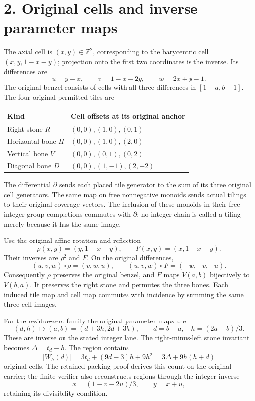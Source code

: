 \documentclass[
  11pt,
]{article}
\begin{document}

\section{2. Original cells and inverse parameter
maps}\label{original-cells-and-inverse-parameter-maps}

The axial cell is \((x,y)\in\mathbb Z^2\), corresponding to the
barycentric cell \((x,y,1-x-y)\); projection onto the first two
coordinates is the inverse. Its differences are \[
 u=y-x,\qquad v=1-x-2y,\qquad w=2x+y-1.
\] The original benzel consists of cells with all three differences in
\([1-a,b-1]\). The four original permitted tiles are

\begin{longtable}[]{@{}ll@{}}
\toprule\noalign{}
Kind & Cell offsets at its original anchor \\
\midrule\noalign{}
\endhead
\bottomrule\noalign{}
\endlastfoot
Right stone \(R\) & \((0,0),(1,0),(0,1)\) \\
Horizontal bone \(H\) & \((0,0),(1,0),(2,0)\) \\
Vertical bone \(V\) & \((0,0),(0,1),(0,2)\) \\
Diagonal bone \(D\) & \((0,0),(1,-1),(2,-2)\) \\
\end{longtable}

The differential \(\partial\) sends each placed tile generator to the
sum of its three original cell generators. The same map on free
nonnegative monoids sends actual tilings to their original coverage
vectors. The inclusion of these monoids in their free integer group
completions commutes with \(\partial\); no integer chain is called a
tiling merely because it has the same image.

Use the original affine rotation and reflection \[
 \rho(x,y)=(y,1-x-y),\qquad F(x,y)=(x,1-x-y).
\] Their inverses are \(\rho^2\) and \(F\). On the original differences,
\[
 (u,v,w)\circ\rho=(v,w,u),\qquad
 (u,v,w)\circ F=(-w,-v,-u).
\] Consequently \(\rho\) preserves the original benzel, and \(F\) maps
\(V(a,b)\) bijectively to \(V(b,a)\). It preserves the right stone and
permutes the three bones. Each induced tile map and cell map commutes
with incidence by summing the same three cell images.

For the residue-zero family the original parameter maps are \[
 (d,h)\longmapsto(a,b)=(d+3h,2d+3h),\qquad
 d=b-a,\quad h=(2a-b)/3.
\] These are inverse on the stated integer lane. The right-minus-left
stone invariant becomes \(\Delta=t_d-h\). The region contains \[
 |W_h(d)|=3t_d+(9d-3)h+9h^2
          =3\Delta+9h(h+d)
\] original cells. The retained packing proof derives this count on the
original carrier; the finite verifier also reconstructs regions through
the integer inverse \[
 x=(1-v-2u)/3,\qquad y=x+u,
\] retaining its divisibility condition.
\end{document}
